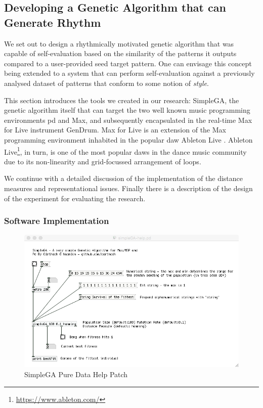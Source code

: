 \subsection{Developing a Genetic Algorithm that can Generate Rhythm}

We set out to design a rhythmically motivated genetic algorithm that was capable of self-evaluation based on the similarity of the patterns it outputs compared to a user-provided seed target pattern. One can envisage this concept being extended to a system that can perform self-evaluation against a previously analysed dataset of patterns that conform to some notion of \textit{style}. 

This section introduces the tools we created in our research: SimpleGA, the genetic algorithm itself that can target the two well known music programming environments \acrshort{pd} and Max, and subsequently encapsulated in the real-time Max for Live instrument GenDrum. Max for Live is an extension of the Max programming environment inhabited in the popular \acrshort{daw} Ableton Live \citep{Manzo2015}. Ableton Live\footnote{\url{https://www.ableton.com/}}, in turn, is one of the most popular \acrshort{daw}s in the dance music community due to its non-linearity and grid-focussed arrangement of loops. 

We continue with a detailed discussion of the implementation of the distance measures and representational issues. Finally there is a description of the design of the experiment for evaluating the research.

\subsubsection{Software Implementation}

\begin{figure}
	\begin{center}
		\includegraphics[width=\figSizeHundred]{ch03_symbolic/figures/simpleGA.png}
	\end{center}
	\caption[SimpleGA Pure Data Help Patch]{SimpleGA Pure Data Help Patch}
	\label{fig:simplega}
\end{figure}


